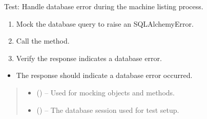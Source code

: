 \documentclass[letterpaper,10pt,english]{sphinxmanual}
\begin{document}
\begin{fulllineitems}
\label{\detokenize{test:test.test_machine.test_list_machines_db_error}}
\pysigstartsignatures
\pysiglinewithargsret
{}
{\sphinxparamcomma {}}
{}
\pysigstopsignatures
\sphinxAtStartPar
Test: Handle database error during the machine listing process.
\begin{description}
\begin{enumerate}
%
\item {} 
\sphinxAtStartPar
Mock the database query to raise an SQLAlchemyError.

\item {} 
\sphinxAtStartPar
Call the  method.

\item {} 
\sphinxAtStartPar
Verify the response indicates a database error.

\end{enumerate}

\begin{itemize}
\item {} 
\sphinxAtStartPar
The response should indicate a database error occurred.

\end{itemize}

\end{description}
\begin{quote}\begin{description}
\begin{itemize}
\item {} 
\sphinxAtStartPar
{} () – Used for mocking objects and methods.

\item {} 
\sphinxAtStartPar
{} () – The database session used for test setup.

\end{itemize}

\end{description}\end{quote}

\end{fulllineitems}
\end{document}
